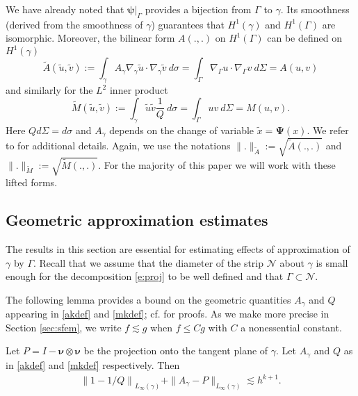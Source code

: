 \documentclass{siamart0516}
\newcommand{\bnu}{\ensuremath{\boldsymbol \nu}}
\newcommand{\bpsi}{\ensuremath{\boldsymbol \psi}}
\newcommand{\bPsi}{\ensuremath{\boldsymbol \Psi}}
\numberwithin{equation}{section}
\numberwithin{theorem}{section}
\numberwithin{figure}{section}
\begin{document}
We have already noted that $\bpsi|_\Gamma$ provides a bijection from $\Gamma$ to $\gamma$. Its smoothness (derived from the smoothness of $\gamma$) guarantees that  $H^1(\gamma)$ and $H^1(\Gamma)$ are isomorphic. 
Moreover,  the bilinear form $A(.,.)$ on $H^1(\Gamma)$ can be defined on $H^1(\gamma)$ 
\begin{equation}
\widetilde A(\tilde u ,\tilde v  ) := \int_{\gamma}A_\gamma\nabla_{\gamma} \tilde u  \cdot \nabla_{\gamma} \tilde v ~   d\sigma = \int_{\Gamma}\nabla_{\Gamma} u \cdot \nabla_{\Gamma} v~ d\Sigma = A(u,v)
\label{akdef}
\end{equation}
and similarly for the $L^2$ inner product
\begin{equation}
\widetilde M(\tilde u ,\tilde v  ) :=\int_{\gamma}\tilde u \tilde v  \frac{1}{Q} ~ d\sigma = \int_{\Gamma} uv~ d\Sigma =M(u,v).
\label{mkdef}
\end{equation}
Here $Qd\Sigma = d\sigma$ and $A_\gamma$ depends on the change of variable $\tilde x = \bPsi(x)$.
We refer to \cite{Dziuk, D09} for additional details. 
Again, we use the notations $\| . \|_{\widetilde A}:= \sqrt{\widetilde A(.,.)}$ and $\| . \|_{\widetilde M}:= \sqrt{\widetilde M(.,.)}$.
For the majority of this paper we will work with these lifted forms. 





\subsection{Geometric approximation estimates}
The results in this section are essential for estimating effects of approximation of $\gamma$ by $\Gamma$.
Recall that we assume that the diameter of the strip $\mathcal N$ about $\gamma$ is small enough for the decomposition \eqref{e:proj} to be well defined and that $\Gamma \subset \mathcal N$. 


The following lemma provides a bound on the geometric quantities $A_\gamma$ and $Q$ appearing in \eqref{akdef} and \eqref{mkdef}; cf. \cite{D09} for proofs.  As we make more precise in Section \ref{sec:sfem}, we write $f \lesssim g$ when $f \le Cg$ with $C$ a nonessential constant.  
\begin{lemma} 	\label{LinfG}
Let $P=I-\bnu \otimes \bnu$ be the projection onto the tangent plane of $\gamma$. Let $A_{\gamma}$ and $Q$ as in \eqref{akdef} and \eqref{mkdef} respectively. Then
	\begin{align}
	\left\|1-1/Q\right\|_{L_\infty(\gamma)} + \|A_\gamma - P\|_{L_\infty(\gamma)}\lesssim h^{k+1}. 
	\end{align}
\end{lemma}
\end{document}
